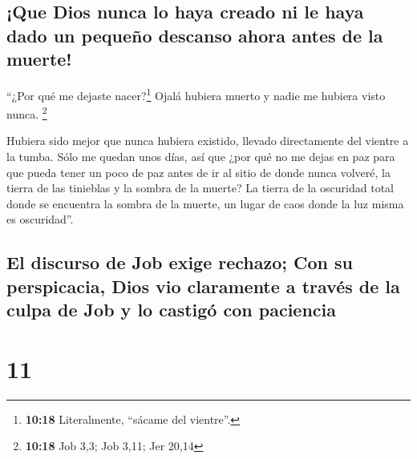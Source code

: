 \hypertarget{que-dios-nunca-lo-haya-creado-ni-le-haya-dado-un-pequeuxf1o-descanso-ahora-antes-de-la-muerte}{%
\subsection{¡Que Dios nunca lo haya creado ni le haya dado un pequeño
descanso ahora antes de la
muerte!}\label{que-dios-nunca-lo-haya-creado-ni-le-haya-dado-un-pequeuxf1o-descanso-ahora-antes-de-la-muerte}}

 ``¿Por qué me dejaste nacer?\footnote{\textbf{10:18}
  Literalmente, ``sácame del vientre''.} Ojalá hubiera muerto y nadie me
hubiera visto nunca. \footnote{\textbf{10:18} Job 3,3; Job 3,11; Jer
  20,14}

 Hubiera sido mejor que nunca hubiera existido, llevado
directamente del vientre a la tumba.  Sólo me quedan unos
días, así que ¿por qué no me dejas en paz para que pueda tener un poco
de paz  antes de ir al sitio de donde nunca volveré, la
tierra de las tinieblas y la sombra de la muerte?  La
tierra de la oscuridad total donde se encuentra la sombra de la muerte,
un lugar de caos donde la luz misma es oscuridad''.

\hypertarget{el-discurso-de-job-exige-rechazo-con-su-perspicacia-dios-vio-claramente-a-travuxe9s-de-la-culpa-de-job-y-lo-castiguxf3-con-paciencia}{%
\subsection{El discurso de Job exige rechazo; Con su perspicacia, Dios
vio claramente a través de la culpa de Job y lo castigó con
paciencia}\label{el-discurso-de-job-exige-rechazo-con-su-perspicacia-dios-vio-claramente-a-travuxe9s-de-la-culpa-de-job-y-lo-castiguxf3-con-paciencia}}

\hypertarget{section-10}{%
\section{11}\label{section-10}}

